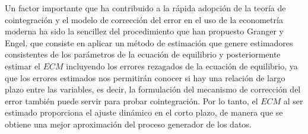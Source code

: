 Un factor importante que ha contribuido a la rápida adopción de la teoría de cointegración y el modelo de corrección del error en el uso de la econometría moderna ha sido la sencillez del procedimiento que han propuesto Granger y Engel, que consiste en aplicar un método de estimación que genere estimadores consistentes de los parámetros de la ecuación de equilibrio y posteriormente estimar el $ECM$ incluyendo los errores rezagados de la ecuación de equilibrio, ya que los errores estimados nos permitirán conocer si hay una relación de largo plazo entre las variables, es decir, la formulación del mecanismo de corrección del error también puede servir para probar cointegración. Por lo tanto, el $ECM$ al ser estimado proporciona el ajuste dinámico en el corto plazo, de manera que se obtiene una mejor aproximación del proceso generador de los datos.  
 
 
%
%
%
%   


